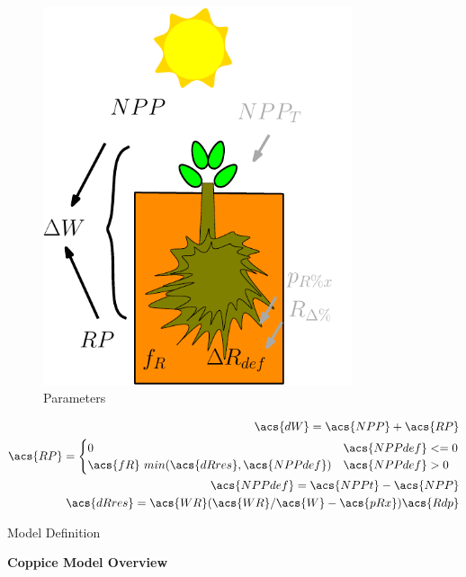 \documentclass[10pt]{article}
\begin{document}
\begin{figure}[!ht]
  \centering
\begin{subfigure}[b]{.2\linewidth}
  \includegraphics[width=1.0\linewidth]{img/tree_pics_10}
  \caption{Parameters}
  \label{fig:coppice-img}
\end{subfigure}
\quad
\begin{subtable}[b]{.75\linewidth}
\begin{align}
\acs{dW}=\acs{NPP}+\acs{RP} \\
\acs{RP} = \begin{cases} 0 & \acs{NPPdef} <=0 \\
\acs{fR} ~ min (\acs{dRres} ,\acs{NPPdef}) & \acs{NPPdef} > 0  
\end{cases} \\
\acs{NPPdef} = \acs{NPPt}-\acs{NPP} \\
\acs{dRres} = \acs{WR}(\acs{WR}/\acs{W} - \acs{pRx})\acs{Rdp}
\end{align}
\caption{Model Definition}
\end{subtable}
\caption{\textbf{Coppice Model Overview}}
  \label{fig:coppice}
\end{figure}
\end{document}
